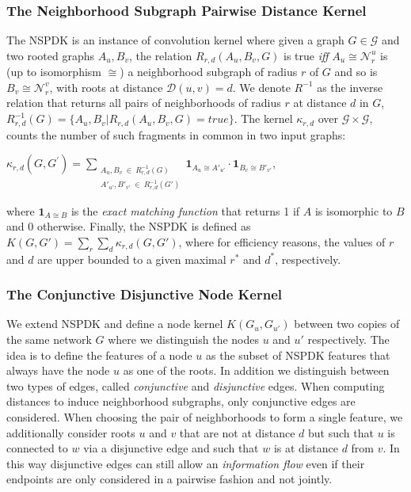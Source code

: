 \documentclass[review]{elsarticle}
\begin{document}
\subsubsection{The Neighborhood Subgraph Pairwise Distance Kernel}
The NSPDK is an instance of convolution kernel \cite{haussler1999convolution} where given a graph $G \in \mathcal{G}$ and two rooted graphs $A_u, B_v$, the relation $R_{r,d}(A_u, B_v, G)$ is true {\em iff} $A_u \cong \mathcal{N}_r^u$ is (up to isomorphism $\cong$) a neighborhood subgraph of radius $r$ of $G$ and so is $B_v \cong  \mathcal{N}_r^v$, with roots at distance $\mathcal{D}(u,v)= d$. We denote $R^{-1}$ as the inverse relation that returns all pairs of neighborhoods of radius $r$ at distance $d$ in $G$, $R^{-1}_{r,d}(G) = \lbrace A_u, B_v | R_{r,d}(A_u,B_v,G)=true\rbrace$. The kernel $\kappa_{r,d}$ over $\mathcal{G} \times \mathcal{G}$, counts the number of such fragments in common in two input graphs: 
\begin{center}
$\kappa_{r,d}(G,G^{'}) = 
\!\!\!\!\!\!\!\!\!\!\!\! 
\sum\limits_{\substack{A_u, B_v \ \in \ R_{r,d}^{-1}(G) \\ 
{A'}_{u'}, {B'}_{v'} \ \in \ R_{r,d}^{-1}(G')
}} \!\!\!\!\!\!\!\!\!\!\!\!  { { \textbf{1}_{A_{u} \cong A'_{u'}}} \cdot {
\textbf{1}_{B_{v} \cong B'_{v'}}} }$, 
\end{center} 
\noindent where $\textbf{1}_{A \cong B}$ is the \textit{exact matching function} that returns 1 if $A$ is
isomorphic to $B$ and 0 otherwise.  Finally, the NSPDK is defined as $K(G,G') = \sum\limits_{r}{\sum\limits_{d}{\kappa_{r,d}(G,G')}}$, where for efficiency reasons, the values of $r$ and $d$ are upper bounded to a given maximal $r^*$ and $d^*$, respectively.

\subsubsection{The Conjunctive Disjunctive Node Kernel}
We extend NSPDK and define a node kernel $K(G_u,G_{u'})$ between two copies of the same network $G$ where we distinguish the nodes $u$ and $u'$ respectively. The idea is to define the features of a node $u$ as the subset of NSPDK features that always have the node $u$ as one of the roots. In addition we distinguish between two types of edges, called {\em conjunctive} and {\em disjunctive} edges. When computing distances to induce neighborhood subgraphs, only conjunctive edges are considered. When choosing the
pair of neighborhoods to form a single feature, we additionally consider roots $u$ and $v$ that are not at distance $d$ but such that $u$ is connected to $w$ via a disjunctive edge and such that $w$ is at distance $d$ from $v$. In this way disjunctive edges can still allow an {\em information flow} even if their
endpoints are only considered in a pairwise fashion and not jointly. 
\end{document}
